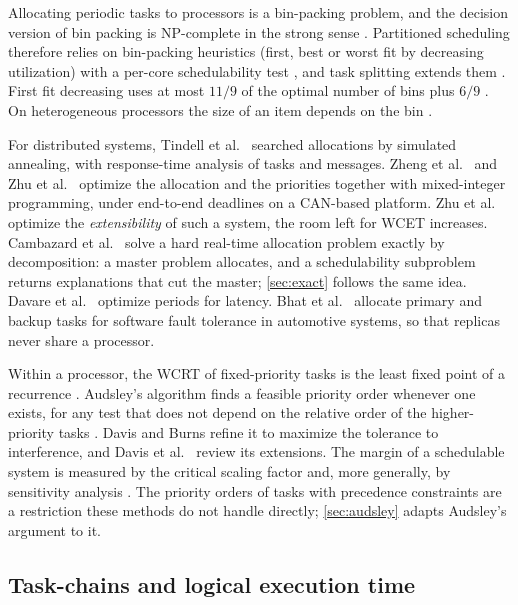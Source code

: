 Allocating periodic tasks to processors is a bin-packing problem, and the
decision version of bin packing is NP-complete in the strong sense
\cite{garey1979computers}. Partitioned scheduling therefore
relies on bin-packing heuristics (first, best or worst fit by decreasing
utilization) with a per-core schedulability test \cite{davis2011survey},
and task splitting extends them \cite{lakshmanan2009partitioned}. First fit decreasing uses at most $11/9$ of
the optimal number of bins plus $6/9$ \cite{dosa2007tight}. On
heterogeneous processors the size of an item depends on the bin
\cite{baruah2004heterogeneous}.

For distributed systems, Tindell et al.\ \cite{tindell1992allocating}
searched allocations by simulated annealing, with response-time analysis
of tasks and messages. Zheng et al.\ \cite{zheng2007definition} and Zhu et
al.\ \cite{zhu2012optimization} optimize the allocation and the priorities
together with mixed-integer programming, under end-to-end deadlines on a
CAN-based platform. Zhu et al.\ \cite{zhu2009optimizing} optimize the
\emph{extensibility} of such a system, the room left for WCET increases.
Cambazard et al.\ \cite{cambazard2004decomposition} solve a hard real-time
allocation problem exactly by decomposition: a master problem allocates,
and a schedulability subproblem returns explanations that cut the master;
\cref{sec:exact} follows the same idea. Davare et al.\
\cite{davare2007period} optimize periods for latency. Bhat et al.\
\cite{bhat2017practical} allocate primary and backup tasks for software
fault tolerance in automotive systems, so that replicas never share a
processor.

Within a processor, the WCRT of fixed-priority tasks is the least fixed
point of a recurrence \cite{joseph1986finding,audsley1993applying}.
Audsley's algorithm \cite{audsley2001priority} finds a feasible priority
order whenever one exists, for any test that does not depend on the
relative order of the higher-priority tasks \cite{davis2016review}. Davis and Burns
\cite{davis2007robust} refine it to maximize the tolerance to
interference, and Davis et al.\ \cite{davis2016review} review its
extensions. The margin of a schedulable system is measured by the
critical scaling factor \cite{lehoczky1989rate} and, more generally, by
sensitivity analysis \cite{bini2008sensitivity}. The priority orders of
tasks with precedence constraints are a restriction these methods do not
handle directly; \cref{sec:audsley} adapts Audsley's argument to it.

\subsection{Task-chains and logical execution time}

